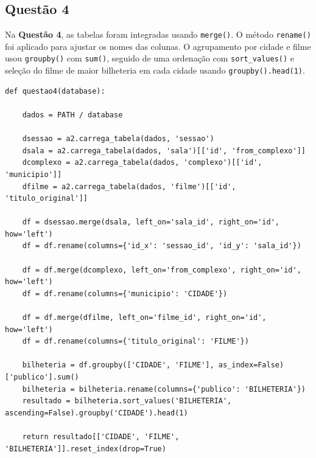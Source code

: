 \documentclass{article}
\begin{document}
\subsection*{Questão 4}
Na \textbf{Questão 4}, as tabelas foram integradas usando \texttt{merge()}. O método \texttt{rename()} foi aplicado para ajustar os nomes das colunas. O agrupamento por cidade e filme usou \texttt{groupby()} com \texttt{sum()}, seguido de uma ordenação com \texttt{sort\_values()} e seleção do filme de maior bilheteria em cada cidade usando \texttt{groupby().head(1)}.
\linespread{1}
\begin{lstlisting}
def questao4(database):

    dados = PATH / database
    
    dsessao = a2.carrega_tabela(dados, 'sessao')
    dsala = a2.carrega_tabela(dados, 'sala')[['id', 'from_complexo']]
    dcomplexo = a2.carrega_tabela(dados, 'complexo')[['id', 'municipio']]
    dfilme = a2.carrega_tabela(dados, 'filme')[['id', 'titulo_original']]

    df = dsessao.merge(dsala, left_on='sala_id', right_on='id', how='left')
    df = df.rename(columns={'id_x': 'sessao_id', 'id_y': 'sala_id'})  

    df = df.merge(dcomplexo, left_on='from_complexo', right_on='id', how='left')
    df = df.rename(columns={'municipio': 'CIDADE'})
    
    df = df.merge(dfilme, left_on='filme_id', right_on='id', how='left')
    df = df.rename(columns={'titulo_original': 'FILME'})

    bilheteria = df.groupby(['CIDADE', 'FILME'], as_index=False)['publico'].sum()
    bilheteria = bilheteria.rename(columns={'publico': 'BILHETERIA'})
    resultado = bilheteria.sort_values('BILHETERIA', ascending=False).groupby('CIDADE').head(1)

    return resultado[['CIDADE', 'FILME', 'BILHETERIA']].reset_index(drop=True)

\end{lstlisting}
\end{document}
